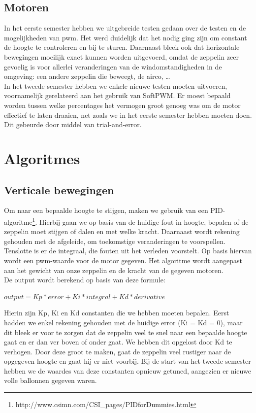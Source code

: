 \documentclass[tt]{penoverslag}
\begin{document}
\subsection{Motoren}
In het eerste semester hebben we uitgebreide testen gedaan over de testen en de mogelijkheden van pwm. Het werd duidelijk dat het nodig ging zijn om constant de hoogte te controleren en bij te sturen. Daarnaast bleek ook dat horizontale bewegingen moeilijk exact kunnen worden uitgevoerd, omdat de zeppelin zeer gevoelig is voor allerlei veranderingen van de windomstandigheden in de omgeving: een andere zeppelin die beweegt, de airco, \ldots \\

In het tweede semester hebben we enkele nieuwe testen moeten uitvoeren, voornamelijk gerelateerd aan het gebruik van SoftPWM. Er moest bepaald worden tussen welke percentages het vermogen groot genoeg was om de motor effectief te laten draaien, net zoals we in het eerste semester hebben moeten doen. Dit gebeurde door middel van trial-and-error.  

\section{Algoritmes}
\subsection{Verticale bewegingen}
Om naar een bepaalde hoogte te stijgen, maken we gebruik van een PID-algoritme\footnote{http://www.csimn.com/CSI\_pages/PIDforDummies.html}. Hierbij gaan we op basis van de huidige fout in hoogte, bepalen of de zeppelin moet stijgen of dalen en met welke kracht. Daarnaast wordt rekening gehouden met de afgeleide, om toekomstige veranderingen te voorspellen. Tenslotte is er de integraal, die fouten uit het verleden voorstelt. Op basis hiervan wordt een pwm-waarde voor de motor gegeven. Het algoritme wordt aangepast aan het gewicht van onze zeppelin en de kracht van de gegeven motoren. \\
De output wordt berekend op basis van deze formule:

\begin{center}
$output = Kp*error + Ki*integral + Kd*derivative$\\
\end{center}

Hierin zijn Kp, Ki en Kd constanten die we hebben moeten bepalen. Eerst hadden we enkel rekening gehouden met de huidige error (Ki = Kd = 0), maar dit bleek er voor te zorgen dat de zeppelin veel te snel naar een bepaalde hoogte gaat en er dan ver boven of onder gaat. We hebben dit opgelost door Kd te verhogen. Door deze groot te maken, gaat de zeppelin veel rustiger naar de opgegeven hoogte en gaat hij er niet voorbij. Bij de start van het tweede semester hebben we de waardes van deze constanten opnieuw getuned, aangezien er nieuwe volle ballonnen gegeven waren. \\
\end{document}
